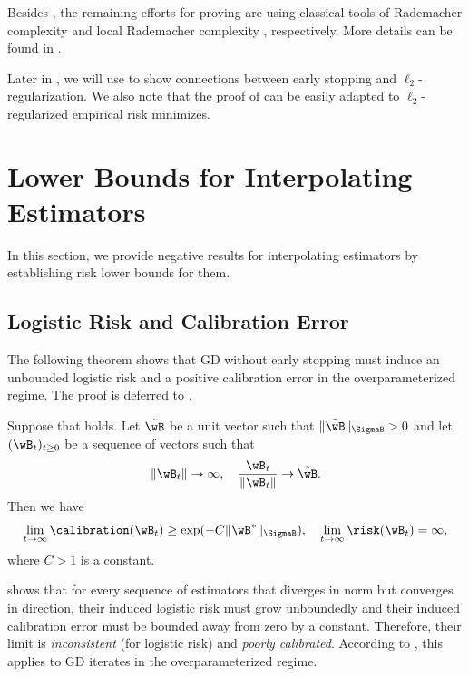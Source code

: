 \documentclass[11pt]{article}
\begin{document}
Besides , the remaining efforts for proving  are using classical tools of Rademacher complexity \citep{bartlett2002rademacher,kakade2008complexity} and local Rademacher complexity \citep{bartlett2005local}, respectively. More details can be found in .

Later in , we will use  to show connections between early stopping and $\ell_2$-regularization.
We also note that the proof of  can be easily adapted to $\ell_2$-regularized empirical risk minimizes.


\section{Lower Bounds for Interpolating Estimators}\label{sec:lower-bound}
In this section, we provide negative results for interpolating estimators by establishing risk lower bounds for them.


\subsection{Logistic Risk and Calibration Error}
The following theorem shows that GD without early stopping must induce an unbounded logistic risk and a positive calibration error in the overparameterized regime. The proof is deferred to .

\begin{theorem}\label{thm:logistic:lower-bound}
Suppose that  holds. 
Let $\tilde\wB$ be a unit vector such that $\|\tilde \wB\|_{\SigmaB} > 0$ and let $(\wB_t)_{t\ge 0}$ be a sequence of vectors such that 
\begin{align*}
    \|\wB_t\|\to \infty,\quad 
    \frac{\wB_t}{\|\wB_t\|} \to \tilde\wB.
\end{align*}
Then we have
\begin{align*}
\lim_{t\to\infty}\calibration(\wB_t) \ge \exp(-C\|\wB^*\|_{\SigmaB}),\quad 
   \lim_{t\to\infty} \risk(\wB_t) = \infty,
\end{align*}
where $C>1$ is a constant.
\end{theorem}

 shows that for every sequence of estimators that diverges in norm but converges in direction, their induced logistic risk must grow unboundedly and their induced calibration error must be bounded away from zero by a constant. 
Therefore, their limit is \emph{inconsistent} (for logistic risk) and \emph{poorly calibrated}. 
According to , this applies to GD iterates in the overparameterized regime. 
\end{document}
